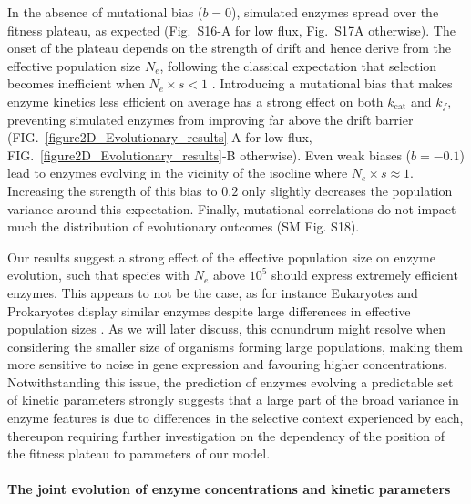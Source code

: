 In the absence of mutational bias ($b=0$), simulated enzymes spread over the fitness plateau, as expected (Fig.~S16-A for low flux, Fig.~S17A otherwise). The onset of the plateau depends on the strength of drift and hence derive from the effective population size $N_e$, following the classical expectation that selection becomes inefficient when $N_e \times s < 1$ \citep{Wright31,Kimura68}. Introducing a mutational bias that makes enzyme kinetics less efficient on average has a strong effect on both $k_\text{cat}$ and $k_f$, preventing simulated enzymes from improving far above the drift barrier (FIG.~\ref{figure2D_Evolutionary_results}-A for low flux, FIG.~\ref{figure2D_Evolutionary_results}-B otherwise). 
Even weak biases ($b=-0.1$) lead to enzymes evolving in the vicinity of the isocline where $N_e \times s \approx 1$. Increasing the strength of this bias to $0.2$ only slightly decreases the population variance around this expectation. Finally, mutational correlations do not impact much the distribution of evolutionary outcomes (SM Fig. S18).

Our results suggest a strong effect of the effective population size on enzyme evolution, such that species with $N_e$ above $10^5$ \citep[most unicellular organisms]{Bobay18} should express extremely efficient enzymes. This appears to not be the case, as for instance Eukaryotes and Prokaryotes display similar enzymes despite large differences in effective population sizes \citep{Bar-Even11}. As we will later discuss, this conundrum might resolve when considering the smaller size of organisms forming large populations, making them more sensitive to noise in gene expression and favouring higher concentrations. 
Notwithstanding this issue, the prediction of enzymes evolving a predictable set of kinetic parameters strongly suggests that a large part of the broad variance in enzyme features is due to differences in the selective context experienced by each, thereupon requiring further investigation on the dependency of the position of the fitness plateau to parameters of our model.

\noindent \paragraph{The joint evolution of enzyme concentrations and kinetic parameters}

